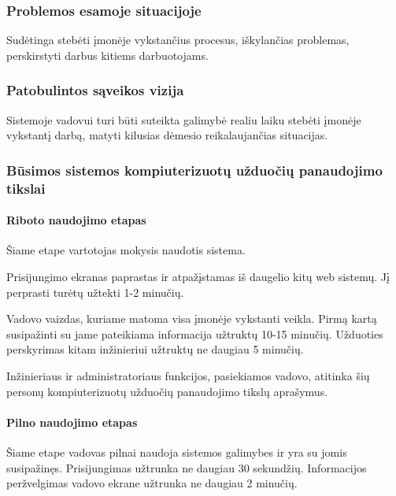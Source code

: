 		\subsubsection{Problemos esamoje situacijoje}
		
		Sudėtinga stebėti įmonėje vykstančius procesus, iškylančias problemas, perskirstyti darbus kitiems darbuotojams.
		
		\subsubsection{Patobulintos sąveikos vizija}
		
		Sistemoje vadovui turi būti suteikta galimybė realiu laiku stebėti įmonėje vykstantį darbą, matyti kilusias dėmesio reikalaujančias situacijas.
		
		\subsubsection{Būsimos sistemos kompiuterizuotų užduočių panaudojimo tikslai}
		
			\setcounter{tocdepth}{5} \setcounter{secnumdepth}{5}
			
			\paragraph{Riboto naudojimo etapas}
			
			Šiame etape vartotojas mokysis naudotis sistema.
			
			Prisijungimo ekranas paprastas ir atpažįstamas iš daugelio kitų web sistemų.
			Jį perprasti turėtų užtekti 1-2 minučių.

			Vadovo vaizdas, kuriame matoma visa įmonėje vykstanti veikla.
			Pirmą kartą susipažinti su jame pateikiama informacija užtruktų 10-15 minučių.
			Užduoties perskyrimas kitam inžinieriui užtruktų ne daugiau 5 minučių.
						
			Inžinieriaus ir administratoriaus funkcijos, pasiekiamos vadovo, atitinka šių personų kompiuterizuotų užduočių panaudojimo tikslų aprašymus.
			
			\setcounter{tocdepth}{5} \setcounter{secnumdepth}{5}
			
			\paragraph{Pilno naudojimo etapas}
			
			Šiame etape vadovas pilnai naudoja sistemos galimybes ir yra su jomis susipažinęs.
			Prisijungimas užtrunka ne daugiau 30 sekundžių. Informacijos peržvelgimas vadovo ekrane užtrunka ne daugiau 2 minučių.
			

